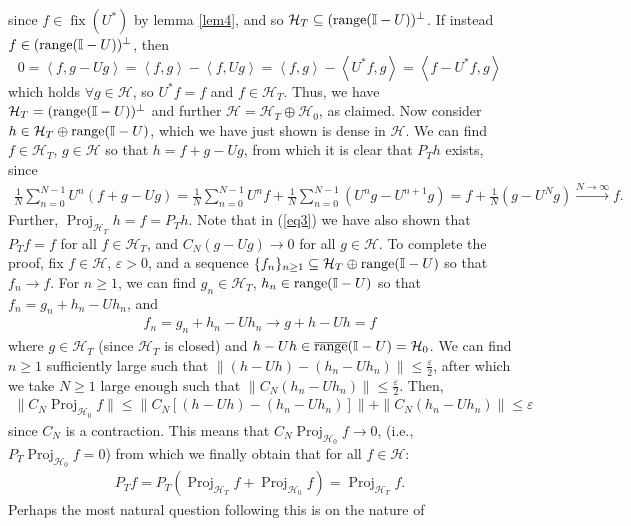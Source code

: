 \documentclass[11pt]{report}
\newcommand{\mc}[1]{\mathcal{#1}}
\newcommand{\ip}[2]{\left\langle#1,#2\right\rangle }
\DeclareMathOperator{\fix}{fix}
\DeclareMathOperator{\ran}{range}
\DeclareMathOperator{\proj}{Proj}
\theoremstyle{definition}
\begin{document}
    since $f\in\fix(U^\ast)$ by lemma \ref{lem4}, and so
    $\mc{H}_T\subseteq(\ran(\mbb{I}-U))^\perp$. If instead
    $f\in(\ran(\mbb{I}-U))^\perp$, then
    \[0=\ip{f}{g-Ug}=\ip{f}{g}-\ip{f}{Ug}=\ip{f}{g}-\ip{U^\ast
    f}{g}=\ip{f-U^\ast f}{g}\] which holds $\forall g\in\mc{H}$, so $U^\ast f=f$
    and $f\in\mc{H}_T$. Thus, we have $\mc{H}_T=(\ran(\mbb{I}-U))^\perp$ and
    further $\mc{H}=\mc{H}_T\oplus\mc{H}_0$, as claimed. Now consider
    $h\in\mc{H}_T\oplus \ran(\mbb{I}-U)$, which we have just shown is dense in
    $\mc{H}$. We can find $f\in\mc{H}_T$, $g\in\mc{H}$ so that $h=f+g-Ug$, from
    which it is clear that $P_Th$ exists, since
    \begin{align}
        \frac{1}{N}\sum_{n=0}^{N-1}U^n(f+g-Ug)=\frac{1}{N}\sum_{n=0}^{N-1}U^nf+\frac{1}{N}\sum_{n=0}^{N-1}(U^ng-U^{n+1}g)=f+\frac{1}{N}(g-U^Ng)\overset{N\rightarrow\infty}{\longrightarrow} f.\label{eq3}
    \end{align}
    Further, $\proj_{\mc{H}_T}h=f=P_Th$. Note that in (\ref{eq3}) we have also
    shown that $P_Tf=f$ for all $f\in\mc{H}_T$, and $C_N(g-Ug)\rightarrow 0$ for
    all $g\in\mc{H}$. To complete the proof, fix $f\in\mc{H}$, $\varepsilon>0$,
    and a sequence $\{f_n\}_{n\geq 1}\subseteq\mc{H}_T\oplus\ran(\mbb{I}-U)$ so
    that $f_n\rightarrow f$. For $n\geq 1$, we can find $g_n\in\mc{H}_T$,
    $h_n\in\ran(\mbb{I}-U)$ so that $f_n=g_n+h_n-Uh_n$, and 
    \begin{align*}
        f_n=g_n+h_n-Uh_n\longrightarrow g+h-Uh=f
    \end{align*}
    where $g\in\mc{H}_T$ (since $\mc{H}_T$ is closed) and
    $h-Uh\in\overline{\ran}(\mbb{I}-U)=\mc{H}_0$. We can find $n\geq 1$
    sufficiently large such that
    $\|(h-Uh)-(h_n-Uh_n)\|\leq\frac{\varepsilon}{2}$, after which we take $N\geq
    1$ large enough such that $\|C_N(h_n-Uh_n)\|\leq\frac{\varepsilon}{2}$.
    Then,
    \begin{align*}
        \|C_N\proj_{\mc{H}_0}f\|\leq\|C_N[(h-Uh)-(h_n-Uh_n)]\|+\|C_N(h_n-Uh_n)\|\leq \varepsilon
    \end{align*}
    since $C_N$ is a contraction. This means that
    $C_N\proj_{\mc{H}_0}f\rightarrow 0$, (i.e., $P_T\proj_{\mc{H}_0}f=0$) from
    which we finally obtain that for all $f\in\mc{H}$:
    \begin{align*}
        P_Tf=P_T(\proj_{\mc{H}_T}f+\proj_{\mc{H}_0}f)=\proj_{\mc{H}_T}f.\tag*{$\qed$}
    \end{align*}
    \indent Perhaps the most natural question following this is on the nature of
\end{document}
